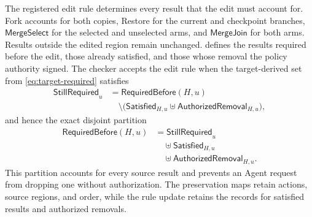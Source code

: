 The registered edit rule determines every result that the edit must account for.
Fork accounts for both copies, Restore for the current and checkpoint branches, \(\mathsf{MergeSelect}\) for the selected and unselected arms, and \(\mathsf{MergeJoin}\) for both arms.
Results outside the edited region remain unchanged.
 defines the results required before the edit, those already satisfied, and those whose removal the policy authority signed.
The checker accepts the edit rule when the target-derived set from \cref{eq:target-required} satisfies
\[
\begin{aligned}
\mathsf{StillRequired}_u
 &=\mathsf{RequiredBefore}(H,u)\\[-2pt]
 &\quad\setminus\bigl(
   \mathsf{Satisfied}_{H,u}\uplus
   \mathsf{AuthorizedRemoval}_{H,u}\bigr),
\end{aligned}
\]
and hence the exact disjoint partition
\[
\begin{aligned}
\mathsf{RequiredBefore}(H,u)
 &=\mathsf{StillRequired}_u\\[-2pt]
 &\quad\uplus\mathsf{Satisfied}_{H,u}\\[-2pt]
 &\quad\uplus\mathsf{AuthorizedRemoval}_{H,u}.
\end{aligned}
\]
This partition accounts for every source result and prevents an Agent request from dropping one without authorization.
The preservation maps retain actions, source regions, and order, while the rule update retains the records for satisfied results and authorized removals.


